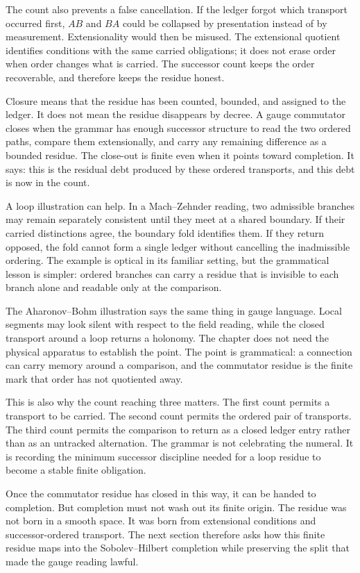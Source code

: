 The count also prevents a false cancellation. If the ledger forgot which
transport occurred first, \(AB\) and \(BA\) could be collapsed by presentation
instead of by measurement. Extensionality would then be misused. The
extensional quotient identifies conditions with the same carried obligations;
it does not erase order when order changes what is carried. The successor
count keeps the order recoverable, and therefore keeps the residue honest.

Closure means that the residue has been counted, bounded, and assigned to the
ledger. It does not mean the residue disappears by decree. A gauge
commutator closes when the grammar has enough successor structure to read
the two ordered paths, compare them extensionally, and carry any remaining
difference as a bounded residue. The close-out is finite even when it points
toward completion. It says: this is the residual debt produced by these
ordered transports, and this debt is now in the count.

A loop illustration can help. In a Mach--Zehnder reading, two admissible
branches may remain separately consistent until they meet at a shared
boundary. If their carried distinctions agree, the boundary fold identifies
them. If they return opposed, the fold cannot form a single ledger without
cancelling the inadmissible ordering. The example is optical in its familiar
setting, but the grammatical lesson is simpler: ordered branches can carry a
residue that is invisible to each branch alone and readable only at the
comparison.

The Aharonov--Bohm illustration says the same thing in gauge language. Local
segments may look silent with respect to the field reading, while the closed
transport around a loop returns a holonomy. The chapter does not need the
physical apparatus to establish the point. The point is grammatical: a
connection can carry memory around a comparison, and the commutator residue
is the finite mark that order has not quotiented away.

This is also why the count reaching three matters. The first count permits a
transport to be carried. The second count permits the ordered pair of
transports. The third count permits the comparison to return as a closed
ledger entry rather than as an untracked alternation. The grammar is not
celebrating the numeral. It is recording the minimum successor discipline
needed for a loop residue to become a stable finite obligation.

Once the commutator residue has closed in this way, it can be handed to
completion. But completion must not wash out its finite origin. The residue
was not born in a smooth space. It was born from extensional conditions and
successor-ordered transport. The next section therefore asks how this finite
residue maps into the Sobolev--Hilbert completion while preserving the split
that made the gauge reading lawful.

